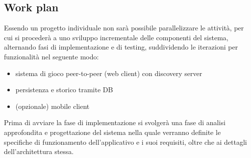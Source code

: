 \subsection{Work plan}
Essendo un progetto individuale non sarà possibile parallelizzare le attività, per cui si procederà a uno sviluppo incrementale delle componenti del sistema,  alternando fasi di implementazione e di testing, suddividendo le iterazioni per funzionalità nel seguente modo:
\begin{itemize}
    \item sistema di gioco peer-to-peer (web client) con discovery server
    \item persistenza e storico tramite DB
    \item (opzionale) mobile client
\end{itemize}

Prima di avviare la fase di implementazione si svolgerà una fase di analisi approfondita e progettazione del sistema nella quale verranno definite le specifiche di funzionamento dell'applicativo e i suoi requisiti, oltre che ai dettagli dell'architettura stessa.
